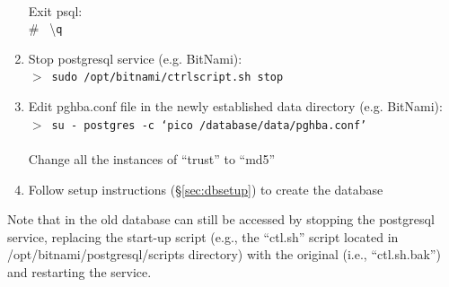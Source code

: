 \begin{enumerate}
         \\
         Exit psql:\\ 
         $\#$~ \textbackslash \texttt{q}
   \item Stop postgresql service (e.g. BitNami):\\
         $>$~\texttt{sudo /opt/bitnami/ctrlscript.sh stop}
   \item Edit pg\textunderscore hba.conf file in the newly established data directory (e.g. 
         BitNami):\\
         $>$~\texttt{su - postgres -c `pico /database/data/pg\textunderscore hba.conf'}\\
         \\
         Change all the instances of ``trust'' to ``md5''
   \item Follow setup instructions (\S \ref{sec:dbsetup}) to create the 
         database
\end{enumerate}

Note that in the old database can still be accessed by stopping the postgresql service, replacing the start-up script (e.g., the ``ctl.sh'' script located in /opt/bitnami/postgresql/scripts directory) with the original (i.e., ``ctl.sh.bak'') and restarting the service.
